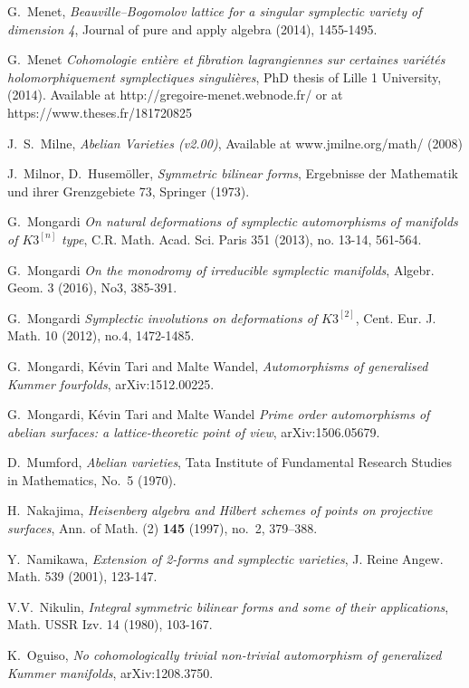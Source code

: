\documentclass{alggeom}
\theoremstyle{plain}
\theoremstyle{definition}
\theoremstyle{remark}
\begin{document}
\begin{thebibliography}{10}
G.~Menet,
\emph{Beauville--Bogomolov lattice for a singular symplectic variety of dimension 4},
Journal of pure and apply algebra (2014), 1455-1495.

G.~Menet
\emph{Cohomologie enti\`ere et fibration lagrangiennes sur certaines vari\'et\'es holomorphiquement symplectiques singuli\`eres},
PhD thesis of Lille 1 University, (2014). Available at http://gregoire-menet.webnode.fr/ or at https://www.theses.fr/181720825

J.~S.~Milne, \emph{Abelian Varieties (v2.00)}, Available at www.jmilne.org/math/ (2008)  

J.~Milnor, D.~Husem\"oller, \emph{Symmetric bilinear forms}, Ergebnisse der Mathematik
  und ihrer Grenzgebiete 73, Springer (1973).

G.~Mongardi
\emph{On natural deformations of symplectic automorphisms of manifolds of $K3^{[n]}$ type},
C.R. Math. Acad. Sci. Paris  
351 (2013), no. 13-14, 561-564.

G.~Mongardi
\emph{On the monodromy of irreducible symplectic manifolds},
Algebr. Geom. 
3 (2016), No3, 385-391.

G.~Mongardi
\emph{Symplectic involutions on deformations of $K3^{[2]}$},
Cent. Eur. J. Math. 
10 (2012), no.4, 1472-1485.

G.~Mongardi, K\'evin Tari and Malte Wandel,
\emph{Automorphisms of generalised Kummer fourfolds},
arXiv:1512.00225. 

G.~Mongardi, K\'evin Tari and Malte Wandel
\emph{Prime order automorphisms of abelian surfaces: a lattice-theoretic point of view},
arXiv:1506.05679. 

D.~Mumford, \emph{Abelian varieties}, Tata Institute of Fundamental Research Studies in Mathematics, 
  No.~5 (1970).

H.~Nakajima, \emph{Heisenberg algebra and Hilbert schemes of points on
  projective surfaces}, Ann. of Math. (2) \textbf{145} (1997), no.~2, 379--388.

Y.~Namikawa,
\emph{Extension of 2-forms and symplectic varieties},
J. Reine Angew. Math. 
539 (2001), 123-147.

V.V.~Nikulin,
\emph{Integral symmetric bilinear forms and some of their applications},
Math. USSR Izv.
14 (1980), 103-167.

K.~Oguiso,
\emph{No cohomologically trivial non-trivial automorphism of generalized Kummer manifolds},
arXiv:1208.3750.


\end{thebibliography}
\end{document}
